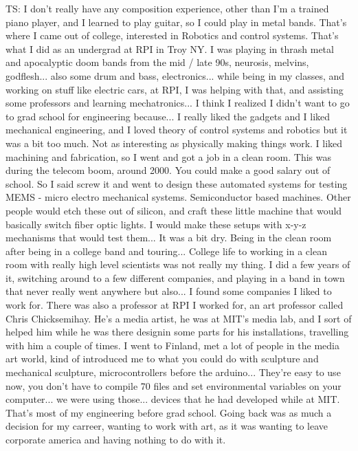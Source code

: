 TS: I don't really have any composition experience, other than I'm a trained piano player, and I learned to play guitar, so I could play in metal bands. That's where I came out of college, interested in Robotics and control systems. That's what I did as an undergrad at RPI in Troy NY. I was playing in thrash metal and apocalyptic doom bands from the mid / late 90s, neurosis, melvins, godflesh... also some drum and bass, electronics... while being in my classes, and working on stuff like electric cars, at RPI, I was helping with that, and assisting some professors and learning mechatronics... I think I realized I didn't want to go to grad school for engineering because... I really liked the gadgets and I liked mechanical engineering, and I loved theory of control systems and robotics but it was a bit too much. Not as interesting as physically making things work. I liked machining and fabrication, so I went and got a job in a clean room. This was during the telecom boom, around 2000. You could make a good salary out of school. So I said screw it and went to design these automated systems for testing MEMS - micro electro mechanical systems. Semiconductor based machines. Other people would etch these out of silicon, and craft these little machine that would basically switch fiber optic lights. I would make these setups with x-y-z mechanisms that would test them... It was a bit dry. Being in the clean room after being in a college band and touring... College life to working in a clean room with really high level scientists was not really my thing. I did a few years of it, switching around to a few different companies, and playing in a band in town that never really went anywhere but also... I found some companies I liked to work for. There was also a professor at RPI I worked for, an art professor called Chris Chicksemihay. He's a media artist, he was at MIT's media lab, and I sort of helped him while he was there designin some parts for his installations, travelling with him a couple of times. I went to Finland, met a lot of people in the media art world, kind of introduced me to what you could do with sculpture and mechanical sculpture, microcontrollers before the arduino... They're easy to use now, you don't have to compile 70 files and set environmental variables on your computer... we were using those... devices that he had developed while at MIT. That's most of my engineering before grad school. Going back was as much a decision for my carreer, wanting to work with art, as it was wanting to leave corporate america and having nothing to do with it. 


